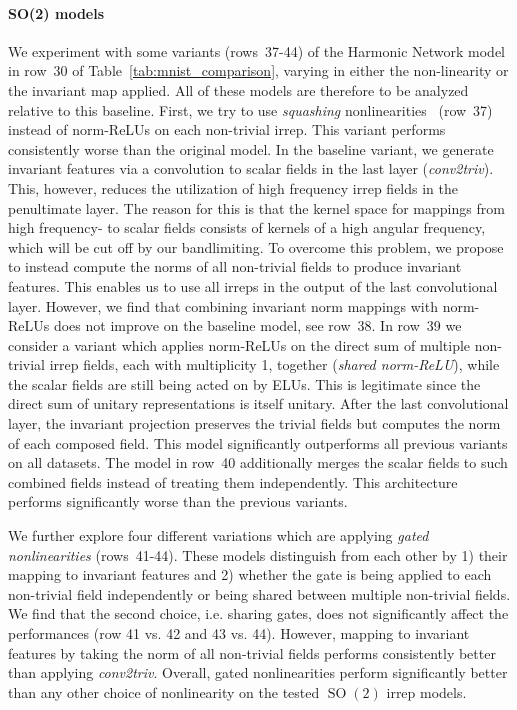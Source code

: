 \documentclass{article}
\newcommand{\SO}[1]{\ensuremath{\operatorname{SO}(#1)}}
\begin{document}
\paragraph{SO(2) models}
We experiment with some variants (rows~37-44) of the Harmonic Network model in row~30 of Table~\ref{tab:mnist_comparison}, varying in either the non-linearity or the invariant map applied.
All of these models are therefore to be analyzed relative to this baseline.
First, we try to use \emph{squashing} nonlinearities~\cite{Hinton2018-EMCAPS} (row~37) instead of norm-ReLUs on each non-trivial irrep.
This variant performs consistently worse than the original model.
In the baseline variant, we generate invariant features via a convolution to scalar fields in the last layer (\emph{conv2triv}).
This, however, reduces the utilization of high frequency irrep fields in the penultimate layer.
The reason for this is that the kernel space for mappings from high frequency- to scalar fields consists of kernels of a high angular frequency, which will be cut off by our bandlimiting.
To overcome this problem, we propose to instead compute the norms of all non-trivial fields to produce invariant features.
This enables us to use all irreps in the output of the last convolutional layer.
However, we find that combining invariant norm mappings with norm-ReLUs does not improve on the baseline model, see row~38.
In row~39 we consider a variant which applies norm-ReLUs on the direct sum of multiple non-trivial irrep fields, each with multiplicity 1, together (\textit{shared norm-ReLU}), while the scalar fields are still being acted on by ELUs.
This is legitimate since the direct sum of unitary representations is itself unitary.
After the last convolutional layer, the invariant projection preserves the trivial fields but computes the norm of each composed field.
This model significantly outperforms all previous variants on all datasets.
The model in row~40 additionally merges the scalar fields to such combined fields instead of treating them independently.
This architecture performs significantly worse than the previous variants.

We further explore four different variations which are applying \textit{gated nonlinearities} (rows~41-44).
These models distinguish from each other by 1) their mapping to invariant features and 2) whether the gate is being applied to each non-trivial field independently or being shared between multiple non-trivial fields.
We find that the second choice, i.e. sharing gates, does not significantly affect the performances (row 41 vs. 42 and 43 vs. 44).
However, mapping to invariant features by taking the norm of all non-trivial fields performs consistently better than applying \textit{conv2triv}.
Overall, gated nonlinearities perform significantly better than any other choice of nonlinearity on the tested $\SO2$ irrep models.
\end{document}
